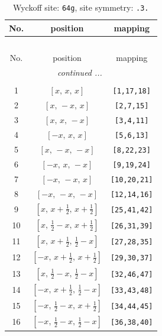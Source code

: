 \documentclass[fleqn,8pt]{jsarticle}
\begin{document}
\begin{longtable}{ccc}
\caption{Wyckoff site: {\tt 64g}, site symmetry: {\tt .3.}}
 \\
 \hline \hline
No. & position & mapping \\ \hline \endfirsthead

\multicolumn{2}{l}{\tablename\ \thetable{}} \\
 \hline \hline
No. & position & mapping \\ \hline \endhead

 \hline \hline
\multicolumn{2}{r}{\footnotesize\it continued ...} \\ \endfoot

 \hline \hline
\multicolumn{2}{r}{} \\ \endlastfoot

1 & $\left[ x,\, x,\, x \right]$ & {\tt [1,17,18]} \\ \hline
2 & $\left[ x,\, - x,\, x \right]$ & {\tt [2,7,15]} \\ \hline
3 & $\left[ x,\, x,\, - x \right]$ & {\tt [3,4,11]} \\ \hline
4 & $\left[ - x,\, x,\, x \right]$ & {\tt [5,6,13]} \\ \hline
5 & $\left[ x,\, - x,\, - x \right]$ & {\tt [8,22,23]} \\ \hline
6 & $\left[ - x,\, x,\, - x \right]$ & {\tt [9,19,24]} \\ \hline
7 & $\left[ - x,\, - x,\, x \right]$ & {\tt [10,20,21]} \\ \hline
8 & $\left[ - x,\, - x,\, - x \right]$ & {\tt [12,14,16]} \\ \hline
9 & $\left[ x,\, x + \frac{1}{2},\, x + \frac{1}{2} \right]$ & {\tt [25,41,42]} \\ \hline
10 & $\left[ x,\, \frac{1}{2} - x,\, x + \frac{1}{2} \right]$ & {\tt [26,31,39]} \\ \hline
11 & $\left[ x,\, x + \frac{1}{2},\, \frac{1}{2} - x \right]$ & {\tt [27,28,35]} \\ \hline
12 & $\left[ - x,\, x + \frac{1}{2},\, x + \frac{1}{2} \right]$ & {\tt [29,30,37]} \\ \hline
13 & $\left[ x,\, \frac{1}{2} - x,\, \frac{1}{2} - x \right]$ & {\tt [32,46,47]} \\ \hline
14 & $\left[ - x,\, x + \frac{1}{2},\, \frac{1}{2} - x \right]$ & {\tt [33,43,48]} \\ \hline
15 & $\left[ - x,\, \frac{1}{2} - x,\, x + \frac{1}{2} \right]$ & {\tt [34,44,45]} \\ \hline
16 & $\left[ - x,\, \frac{1}{2} - x,\, \frac{1}{2} - x \right]$ & {\tt [36,38,40]} \\ \hline

\end{longtable}
\end{document}
